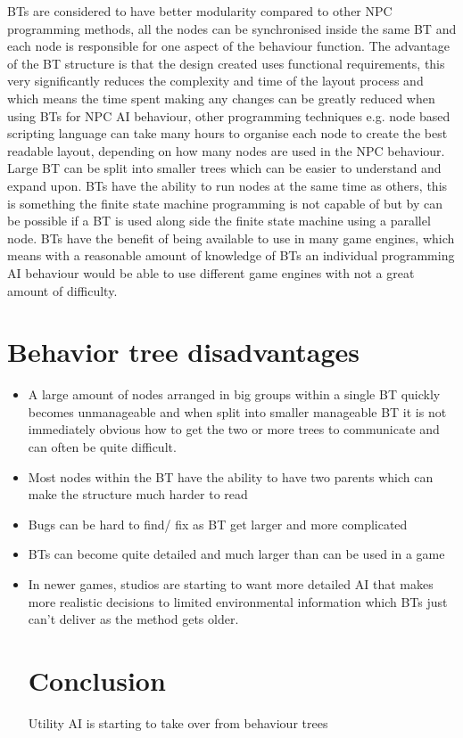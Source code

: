 \documentclass{scrartcl}
\begin{document}
BTs are considered to have better modularity compared to other NPC programming methods, all the nodes can be synchronised inside the same BT and each node is responsible for one aspect of the behaviour function\cite{colledanchise2015learning}. The advantage of the BT structure is that the design created uses functional requirements, this very significantly reduces the complexity and time of the layout process and which means the time spent making any changes can be greatly reduced when using BTs for NPC AI behaviour\cite{dromey2003requirements}, other programming techniques e.g. node based scripting language can take many hours to organise each node to create the best readable layout, depending on how many nodes are used in the NPC behaviour. Large BT can be split into smaller trees which can be easier to understand and expand upon\cite{marzinotto2014towards}. BTs have the ability to run nodes at the same time as others, this is something the finite state machine programming is not capable of but by can be possible if a BT is used along side the finite state machine using a parallel node\cite{SCIRRA}. BTs have the benefit of being available to use in many game engines, which means with a reasonable amount of knowledge of BTs an individual programming AI behaviour would be able to use different game engines with not a great amount of difficulty.

\section{Behavior tree disadvantages}

\begin{itemize}

\item A large amount of nodes arranged in big groups within a single BT quickly becomes unmanageable and when split into smaller manageable BT it is not immediately obvious how to get the two or more trees to communicate\cite{dromey2003requirements} and can often be quite difficult\cite{hmc}.
\item Most nodes within the BT have the ability to have two parents which can make the structure much harder to read\cite{marzinotto2014towards}
\item Bugs can be hard to find/ fix as BT get larger and more complicated\cite{GDCVault}
\item BTs can become quite detailed and much larger than can be used in a game
\item In newer games, studios are starting to want more detailed AI that makes more realistic decisions to limited environmental information which BTs just can't deliver as the method gets older\cite{Gama}.


\section{Conclusion}

Utility AI is starting to take over from behaviour trees \cite{Gama}

 \cite{youtube} \cite{nicolau2016evolutionary} \cite{nareyek2004ai} 




\end{itemize}
\end{document}

